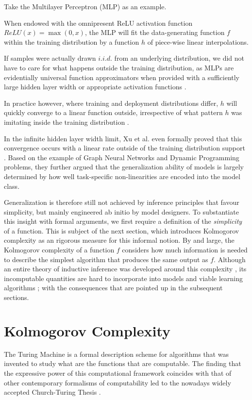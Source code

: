 Take the Multilayer Perceptron (MLP) \cite{rosenblatt1962principles} as an example.

When endowed with the omnipresent ReLU activation function $ReLU(x)=\max(0,x)$, the MLP will fit the data-generating function $f$ within the training distribution by a function $h$ of piece-wise linear interpolations.

If samples were actually drawn $i.i.d.$ from an underlying distribution, we did not have to care for what happens outside the training distribution, as MLPs are evidentially universal function approximators when provided with a sufficiently large hidden layer width or appropriate activation functions \cite{hornik1989multilayer} \cite{LESHNO1993861}.

In practice however, where training and deployment distributions differ, $h$ will quickly converge to a linear function outside, irrespective of what pattern $h$ was imitating inside the training distribution \cite{haley1992extrapolation}.

In the infinite hidden layer width limit, Xu et al. even formally proved that this convergence occurs with a linear rate outside of the training distribution support \cite{xu2019can}.
Based on the example of Graph Neural Networks and Dynamic Programming problems, they further argued that the generalization ability of models is largely determined by how well task-specific non-linearities are encoded into the model class.

Generalization is therefore still not achieved by inference principles that favour simplicity, but mainly engineered ab initio by model designers.
To substantiate this insight with formal arguments, we first require a definition of the \textit{simplicity} of a function.
This is subject of the next section, which introduces Kolmogorov complexity as an rigorous measure for this informal notion.
By and large, the Kolmogorov complexity of a function $f$ considers how much information is needed to describe the simplest algorithm that produces the same output as $f$.
Although an entire theory of inductive inference was developed around this complexity \cite{solomonoff1964formal}, its incomputable quantities are hard to incorporate into models and viable learning algorithms \cite{levin1973universal}; with the consequences that are pointed up in the subsequent sections.

\section{Kolmogorov Complexity}
\label{sec:kolmogorov-complexity}
The Turing Machine is a formal description scheme for algorithms that was invented to study what are the functions that are computable.
The finding that the expressive power of this computational framework coincides with that of other contemporary formalisms of computability led to the nowadays widely accepted Church-Turing Thesis \cite{turing1936computable}\cite{turing1937computability}.

